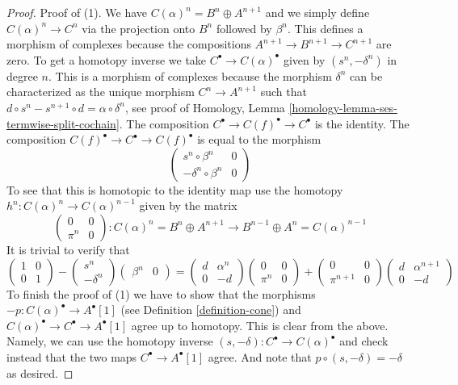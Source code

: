 \begin{proof}
Proof of (1). We have $C(\alpha)^n = B^n \oplus A^{n + 1}$
and we simply define $C(\alpha)^n \to C^n$ via the projection
onto $B^n$ followed by $\beta^n$. This defines
a morphism of complexes because the compositions
$A^{n + 1} \to B^{n + 1} \to C^{n + 1}$ are zero.
To get a homotopy inverse we take
$C^\bullet \to C(\alpha)^\bullet$ given by
$(s^n , -\delta^n)$ in degree $n$. This is a morphism of complexes
because the morphism $\delta^n$ can be characterized as the
unique morphism $C^n \to A^{n + 1}$ such that
$d \circ s^n - s^{n + 1} \circ d = \alpha \circ \delta^n$,
see proof of
Homology, Lemma \ref{homology-lemma-ses-termwise-split-cochain}.
The composition
$C^\bullet \to C(f)^\bullet \to C^\bullet$ is the identity.
The composition $C(f)^\bullet \to C^\bullet \to C(f)^\bullet$
is equal to the morphism
$$
\left(
\begin{matrix}
s^n \circ \beta^n & 0 \\
-\delta^n \circ \beta^n & 0
\end{matrix}
\right)
$$
To see that this is homotopic to the identity map
use the homotopy $h^n : C(\alpha)^n \to C(\alpha)^{n - 1}$
given by the matrix
$$
\left(
\begin{matrix}
0 & 0 \\
\pi^n & 0
\end{matrix}
\right) : C(\alpha)^n = B^n \oplus A^{n + 1} \to
B^{n - 1} \oplus A^n = C(\alpha)^{n - 1}
$$
It is trivial to verify that
$$
\left(
\begin{matrix}
1 & 0 \\
0 & 1
\end{matrix}
\right)
-
\left(
\begin{matrix}
s^n \\
-\delta^n
\end{matrix}
\right)
\left(
\begin{matrix}
\beta^n & 0
\end{matrix}
\right)
=
\left(
\begin{matrix}
d & \alpha^n \\
0 & -d
\end{matrix}
\right)
\left(
\begin{matrix}
0 & 0 \\
\pi^n & 0
\end{matrix}
\right)
+
\left(
\begin{matrix}
0 & 0 \\
\pi^{n + 1} & 0
\end{matrix}
\right)
\left(
\begin{matrix}
d & \alpha^{n + 1} \\
0 & -d
\end{matrix}
\right)
$$
To finish the proof of (1) we have to show that the morphisms
$-p : C(\alpha)^\bullet \to A^\bullet[1]$ (see
Definition \ref{definition-cone})
and  $C(\alpha)^\bullet \to C^\bullet \to A^\bullet[1]$ agree up
to homotopy. This is clear from the above. Namely, we can use the homotopy
inverse $(s, -\delta) : C^\bullet \to C(\alpha)^\bullet$
and check instead that the two maps
$C^\bullet \to A^\bullet[1]$ agree. And note that
$p \circ (s, -\delta) = -\delta$ as desired.


\end{proof}
